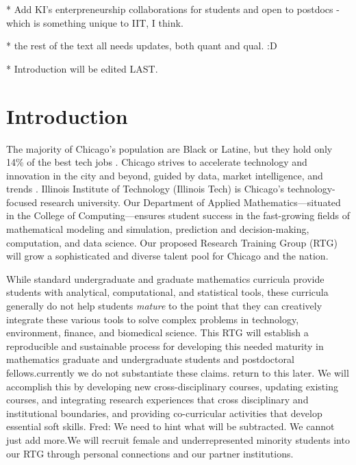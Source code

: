 \documentclass[11pt]{NSFamsart}
\newcommand{\FredNote}[1]{{\color{blue} Fred: #1}}
\begin{document}
* Add KI's enterpreneurship collaborations for students and open to postdocs - which is something unique to IIT, I think. 

* the rest of the text all needs updates, both quant and qual. :D 

* Introduction will be edited LAST. 

\section{Introduction}

The majority of Chicago's population are Black or Latine, 
but they hold only 14\% of the best tech jobs \cite{P33}. 
Chicago strives to accelerate  technology and innovation in the city and beyond, guided by data, market intelligence, and trends \cite{Chicago}. Illinois Institute of Technology (Illinois Tech) is Chicago's technology-focused research university.  Our Department of Applied Mathematics---situated in the College of Computing---ensures student success in the fast-growing fields of mathematical modeling and simulation, prediction and decision-making, computation, and data science. Our proposed Research Training Group (RTG) will grow a sophisticated and diverse talent pool for Chicago and the nation.

While standard undergraduate and graduate mathematics curricula provide students with  analytical, computational, and statistical tools, these curricula generally do not help students \emph{mature} to the point that they can creatively integrate these various  tools to solve complex problems in technology, environment, finance, and biomedical science. This RTG will establish a reproducible and sustainable process for developing this needed maturity in mathematics graduate and undergraduate students and postdoctoral fellows.{\color{magenta}currently we do not substantiate these claims. return to this later.} We will accomplish this by developing new cross-disciplinary courses, updating existing courses, and integrating research experiences that cross disciplinary and institutional boundaries, and providing co-curricular activities that develop essential soft skills.  \FredNote{We need to hint what will be subtracted.  We cannot just add more.}We will recruit female and underrepresented minority students into our RTG through personal connections and our partner institutions.
\end{document}
